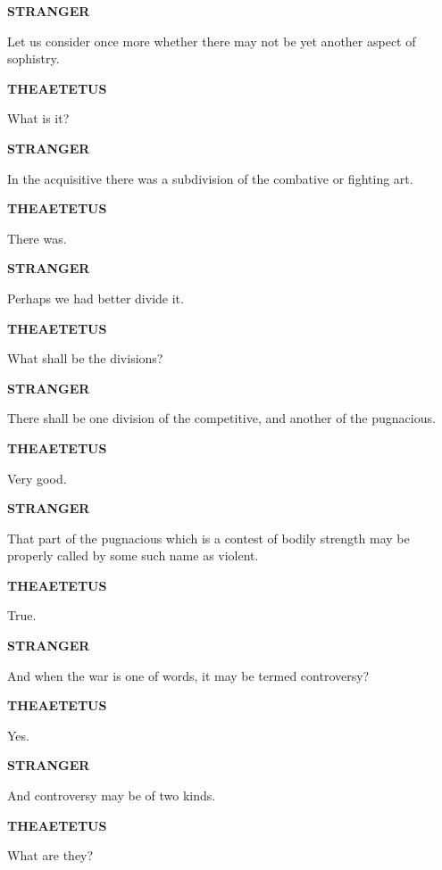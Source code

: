 \documentclass[11pt,letter]{article}
\begin{document}
\par \textbf{STRANGER}
\par   Let us consider once more whether there may not be yet another aspect of sophistry.

\par \textbf{THEAETETUS}
\par   What is it?

\par \textbf{STRANGER}
\par   In the acquisitive there was a subdivision of the combative or fighting art.

\par \textbf{THEAETETUS}
\par   There was.

\par \textbf{STRANGER}
\par   Perhaps we had better divide it.

\par \textbf{THEAETETUS}
\par   What shall be the divisions?

\par \textbf{STRANGER}
\par   There shall be one division of the competitive, and another of the pugnacious.

\par \textbf{THEAETETUS}
\par   Very good.

\par \textbf{STRANGER}
\par   That part of the pugnacious which is a contest of bodily strength may be properly called by some such name as violent.

\par \textbf{THEAETETUS}
\par   True.

\par \textbf{STRANGER}
\par   And when the war is one of words, it may be termed controversy?

\par \textbf{THEAETETUS}
\par   Yes.

\par \textbf{STRANGER}
\par   And controversy may be of two kinds.

\par \textbf{THEAETETUS}
\par   What are they?
\end{document}
